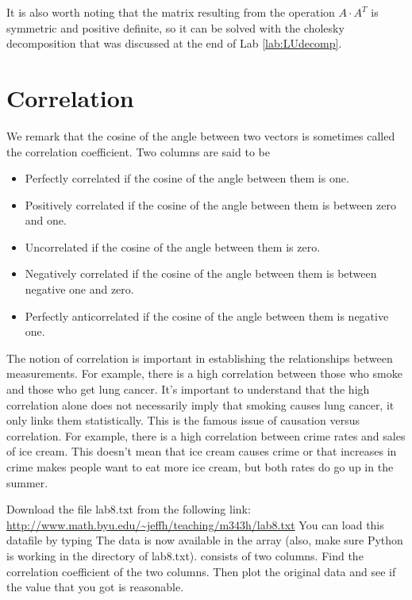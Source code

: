 It is also worth noting that the matrix resulting from the operation $A \cdot A^T$ is symmetric and positive definite, so it can be solved with the cholesky decomposition that was discussed at the end of Lab \ref{lab:LUdecomp}.

\section*{Correlation}

We remark that the cosine of the angle between two vectors is sometimes called the correlation coefficient.  Two columns are said to be 
\begin{itemize}
\item Perfectly correlated if the cosine of the angle between them is one.
\item Positively correlated if the cosine of the angle between them is between zero and one.
\item Uncorrelated if the cosine of the angle between them is zero.
\item Negatively correlated if the cosine of the angle between them is between negative one and zero.
\item Perfectly anticorrelated if the cosine of the angle between them is negative one.
\end{itemize}

The notion of correlation is important in establishing the relationships between measurements.  For example, there is a high correlation between those who smoke and those who get lung cancer.  It's important to understand that the high correlation alone does not necessarily imply that smoking causes lung cancer, it only links them statistically.  This is the famous issue of causation versus correlation.  For example, there is a high correlation between crime rates and sales of ice cream.  This doesn't mean that ice cream causes crime or that increases in crime makes people want to eat more ice cream, but both rates do go up in the summer.

\begin{problem}
Download the file lab8.txt from the following link:
\url{http://www.math.byu.edu/~jeffh/teaching/m343h/lab8.txt}
You can load this datafile by typing
The data is now available in the array  (also, make sure Python is working in the directory of lab8.txt).   consists of two columns.  Find the correlation coefficient of the two columns.  Then plot the original data and see if the value that you got is reasonable.
\end{problem}

